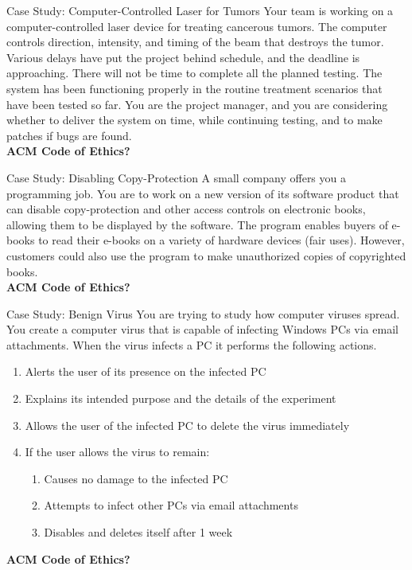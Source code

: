 \documentclass{beamer}
\begin{document}
\begin{frame}{Case Study: Computer-Controlled Laser for Tumors}
Your team is working on a computer-controlled laser device for treating cancerous tumors. The computer controls direction, intensity, and timing of the beam that destroys the tumor. Various delays have put the project behind schedule, and the deadline is approaching. There will not be time to complete all the planned testing. The system has been functioning properly in the routine treatment scenarios that have been tested so far. You are the project manager, and you are considering whether to deliver the system on time, while continuing testing, and to make patches if bugs are found. \\
\bigskip
\textbf{ACM Code of Ethics?}
\end{frame}

\begin{frame}{Case Study: Disabling Copy-Protection}
A small company offers you a programming job. You are to work on a new version of its software product that can disable copy-protection and other access controls on electronic books, allowing them to be displayed by the software. The program enables buyers of e-books to read their e-books on a variety of hardware devices (fair uses). However, customers could also use the program to make unauthorized copies of copyrighted books. \\
\bigskip
\textbf{ACM Code of Ethics?}
\end{frame}

\begin{frame}{Case Study: Benign Virus}
You are trying to study how computer viruses spread. You create a computer virus that is capable of infecting Windows PCs via email attachments. When the virus infects a PC it performs the following actions.
\begin{enumerate}
\item Alerts the user of its presence on the infected PC
\item Explains its intended purpose and the details of the experiment
\item Allows the user of the infected PC to delete the virus immediately
\item If the user allows the virus to remain:
  \begin{enumerate}
  \item Causes no damage to the infected PC
  \item Attempts to infect other PCs via email attachments
  \item Disables and deletes itself after 1 week
  \end{enumerate}
\end{enumerate}
\bigskip
\textbf{ACM Code of Ethics?}
\end{frame}
\end{document}
